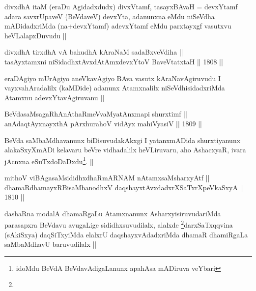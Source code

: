 \begin{artha}
divxdhA itaM (eraDu Agidadxdudx) divxVtamf, tasayxBAvaH = devxYtamf
adara savxrUpaveV (BeVdaveV) devxYta, adanunxna eMdu niSeVdha
mADidadxriMda (na+devxYtamf) adevxYtamf eMdu parxtayxgf vasutxvu
heVLalapxDuvudu ||  
\end{artha}


\begin{shl}
divxdhA tirxdhA vA bahudhA kAraNaM sadaBxveVdiha || \\
tasAyx\s \s tamxni niSidadhxtAvxdAtAmx\s devxYtoV BaveVtatxtaH ||  1808 ||  
\end{shl}

\begin{artha}
eraDAgiyo mUrAgiyo aneVkavAgiyo BAva vasutx kAraNavAgiruvudu I
vayxvahAradalilx (kaMDide) adanunx Atamxnalilx niSeVdhisidadxriMda
Atamxnu adevxYtavAgiruvanu ||
\end{artha}


\begin{shl}
BeVdasaMsagaRhAnAthaRmeVvaMyatAnxmapi shurxtimf ||  \\
anAdaqtAyxnayxthA pArxhurahoV vidAyx mahiVyasiV ||  1809 ||  
\end{shl}

\begin{artha}
BeVda saMbaMdhavanunx biDisuvudakAkxgi I yatanxmADida shurxtiyanunx
alakaSxyXmADi kelavaru beVre vidhadalilx heVLiruvaru, aho AshacxyaR,
ivara jAcnxna eSuTxdoDaDxdu\footnote[1]{idoMdu BeVdA BeVdavAdigaLanunx
apahAsa mADiruva veYbari}. ||
\end{artha}

\begin{shl}
mithoV viBAgasaMsididhxdhaRmARNAM nA\s \s tamxsaMsharxyAtf || \\
dhamaRdhamayxRBisaMbanodhxV daqshayxtAvxdadxrXSaTxrXpeVkaSxyA ||  1810 ||  
\end{shl}

\begin{artha}
dashaRna modalA dhamaRgaLu Atamxnanunx AsharxyisiruvudariMda
parasapxra BeVdavu avugaLige sididhxsuvudilalx,
alalxde \footnote[1]{}darxSaTxqqvina (sAkiSxya) daqSiTxyiMda elalxrU
daqshayxvAdadxriMda dhamaR dhamiRgaLa saMbaMdhavU baruvudilalx ||
\end{artha}


